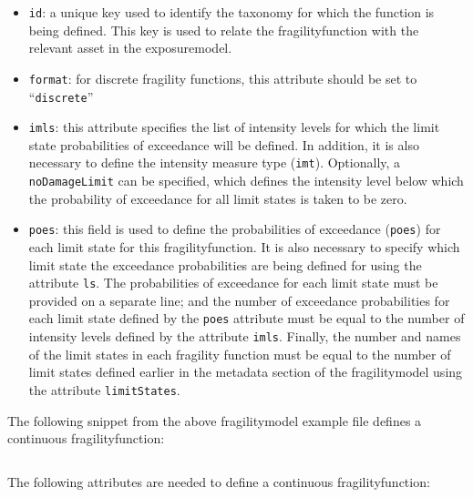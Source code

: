 \begin{itemize}

    \item \Verb+id+: a unique key used to identify the \gls{taxonomy} for 
    which the function is being defined. This key is used to relate the 
    \gls{fragilityfunction} with the relevant \gls{asset} in the 
    \gls{exposuremodel}.

    \item \Verb+format+: for discrete \glspl{fragility function}, this
    attribute should be set to ``\Verb+discrete+''

    \item \Verb+imls+: this attribute specifies the list of intensity levels
    for which the limit state probabilities of exceedance will be defined. 
    In addition, it is also necessary to define the intensity measure type 
    (\Verb+imt+). Optionally, a \Verb+noDamageLimit+ can be specified, which 
    defines the intensity level below which the probability of exceedance 
    for all limit states is taken to be zero.

    \item \Verb+poes+: this field is used to define the probabilities of 
    exceedance (\Verb+poes+) for each limit state for this 
    \gls{fragilityfunction}. It is also necessary to specify which limit 
    state the exceedance probabilities are being defined for using the 
    attribute \Verb+ls+. The probabilities of exceedance for each limit state
    must be provided on a separate line; and the number of exceedance 
    probabilities for each limit state defined by the \Verb+poes+ attribute 
    must be equal to the number of intensity levels defined by the attribute 
    \Verb+imls+. Finally, the number and names of the limit states in each 
    fragility function must be equal to the number of limit states defined 
    earlier in the metadata section of the \gls{fragilitymodel} using the 
    attribute \Verb+limitStates+.

\end{itemize}



The following snippet from the above \gls{fragilitymodel} example file
defines a continuous \gls{fragilityfunction}:

\inputminted[firstline=19,firstnumber=19,lastline=25,fontsize=\footnotesize,frame=single,linenos,bgcolor=lightgray]{xml}{oqum/risk/Verbatim/input_fragility.xml}

The following attributes are needed to define a continuous \gls{fragilityfunction}:

